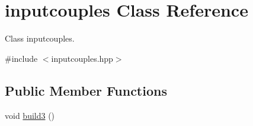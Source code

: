 \hypertarget{classinputcouples}{\section{inputcouples Class Reference}
\label{classinputcouples}
}


Class inputcouples.  




{\ttfamily \#include $<$inputcouples.\-hpp$>$}

\subsection*{Public Member Functions}
\begin{DoxyCompactItemize}
\item 
void \hyperlink{classinputcouples_a2bba472c7dfd775a313ab61a3643e318}{build3} ()
\end{DoxyCompactItemize}
